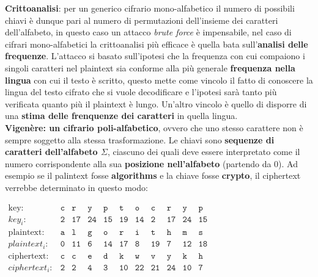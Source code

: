 \textbf{Crittoanalisi}: per un generico cifrario mono-alfabetico il numero di possibili chiavi è dunque pari al numero di permutazioni dell'insieme dei caratteri dell'alfabeto, in questo caso un attacco \textit{brute force} è impensabile, nel caso di cifrari mono-alfabetici la crittoanalisi più efficace è quella bata sull'\textbf{analisi delle frequenze}. L'attacco si basato sull'ipotesi che la frequenza con cui compaiono i singoli caratteri nel plaintext sia conforme alla più generale \textbf{frequenza nella lingua} con cui il testo è scritto, questo mette come vincolo il fatto di conoscere la lingua del testo cifrato che si vuole decodificare e l'ipotesi sarà tanto più verificata quanto più il plaintext è lungo. Un'altro vincolo è quello di disporre di una \textbf{stima delle frenquenze dei caratteri} in quella lingua.
\\ \newline
\textbf{Vigenère: un cifrario poli-alfabetico}, ovvero che uno stesso carattere non è sempre soggetto alla stessa trasformazione. Le chiavi sono \textbf{sequenze di caratteri dell'alfabeto $\Sigma$}, ciascuno dei quali deve essere interpretato come il numero corrispondente alla sua \textbf{posizione nell'alfabeto} (partendo da 0). Ad esempio se il palintext fosse \textbf{algorithms} e la chiave fosse \textbf{crypto}, il ciphertext verrebbe determinato in questo modo:
\begin{center}
    \begin{math}
        \begin{array}{rcccccccccc}
            \textrm{key}:&\mathtt{c}&\mathtt{r}&\mathtt{y}&\mathtt{p}&\mathtt{t}&\mathtt{o}&\mathtt{c}&\mathtt{r}&\mathtt{y}&\mathtt{p}\\
            \textrm{$key_i$}:&\mathtt{2}&\mathtt{17}&\mathtt{24}&\mathtt{15}&\mathtt{19}&\mathtt{14}&\mathtt{2}&\mathtt{17}&\mathtt{24}&\mathtt{15}\\
            \textrm{plaintext}:&\mathtt{a}&\mathtt{l}&\mathtt{g}&\mathtt{o}&\mathtt{r}&\mathtt{i}&\mathtt{t}&\mathtt{h}&\mathtt{m}&\mathtt{s}\\
            \textrm{$plaintext_i$}:&\mathtt{0}&\mathtt{11}&\mathtt{6}&\mathtt{14}&\mathtt{17}&\mathtt{8}&\mathtt{19}&\mathtt{7}&\mathtt{12}&\mathtt{18}\\
            \textrm{ciphertext}:&\mathtt{c}&\mathtt{c}&\mathtt{e}&\mathtt{d}&\mathtt{k}&\mathtt{w}&\mathtt{v}&\mathtt{y}&\mathtt{k}&\mathtt{h}\\
            \textrm{$ciphertext_i$}:&\mathtt{2}&\mathtt{2}&\mathtt{4}&\mathtt{3}&\mathtt{10}&\mathtt{22}&\mathtt{21}&\mathtt{24}&\mathtt{10}&\mathtt{7}
        \end{array}
    \end{math}
\end{center}

